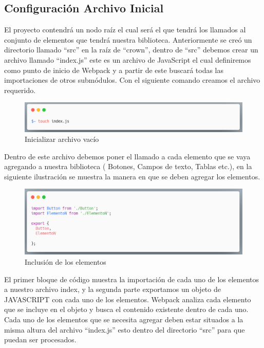\subsection{Configuración Archivo Inicial}
El proyecto contendrá un nodo raíz el cual será el que tendrá los llamados al conjunto de elementos que tendrá nuestra biblioteca. Anteriormente se creó un directorio llamado “src” en la raíz de “crown”, dentro de “src” debemos crear un archivo llamado “index.js” este es un archivo de JavaScript el cual definiremos como punto de inicio de Webpack  y a partir de este buscará todas las importaciones de otros submódulos. Con el siguiente comando creamos el archivo requerido.
\newline
\newline
     \begin{figure}[H]
    \includegraphics[width=1\textwidth]{./Imagenes/carbon.png}
    \caption[Inicializar archivo vacío]{Inicializar archivo vacío}
    \end{figure}
\newline
\newline
Dentro de este archivo debemos poner el llamado a cada elemento que se vaya agregando a nuestra biblioteca ( Botones, Campos de texto, Tablas etc.), en la siguiente ilustración se muestra la manera en que se deben agregar los elementos.
\newline
\newline
\begin{figure}[H]
    \includegraphics[width=1\textwidth]{./Imagenes/carbon-2.png}
    \caption[Inclusión de los elementos]{Inclusión de los elementos}
    \end{figure}
\newline
\newline
El primer bloque de código muestra la importación de cada uno de los elementos a nuestro archivo index, y la segunda parte exportamos un objeto de JAVASCRIPT con cada uno de los elementos.
Webpack analiza cada elemento que se incluye en el objeto y busca el contenido existente dentro de cada uno.
Cada uno de los elementos que se necesita agregar deben estar situados a la misma altura del archivo “index.js” esto dentro del directorio “src” para que puedan ser procesados.
\clearpage


